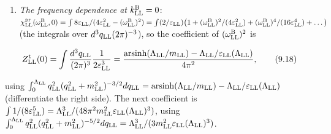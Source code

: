 \documentclass[
  10pt,
]{article}
\providecommand{\tightlist}{%
  \setlength{\itemsep}{0pt}\setlength{\parskip}{0pt}}
\begin{document}
\begin{enumerate}
\def\labelenumi{(\roman{enumi})}
\setcounter{enumi}{1}
\tightlist
\item
  \emph{The frequency dependence at \(k^{\rm B}_{\rm LL}=0\)}:
  \(\chi^{\rm pr}_{\rm LL}(\omega^{\rm B}_{\rm LL},0)=\int8\varepsilon_{\rm LL}/(4\varepsilon_{\rm LL}^2-(\omega^{\rm B}_{\rm LL})^2)=\int(2/\varepsilon_{\rm LL})\big(1+(\omega^{\rm B}_{\rm LL})^2/(4\varepsilon_{\rm LL}^2)+(\omega^{\rm B}_{\rm LL})^4/(16\varepsilon_{\rm LL}^4)+\dots\big)\)
  (the integrals over \(d^3q_{\rm LL}(2\pi)^{-3}\)), so the coefficient
  of \((\omega^{\rm B}_{\rm LL})^2\) is
\end{enumerate}

\[Z^{\rm t}_{\rm LL}(0)=\int\frac{d^3q_{\rm LL}}{(2\pi)^3}\frac1{2\varepsilon_{\rm LL}^3}=\frac{\mathrm{arsinh}(\Lambda_{\rm LL}/m_{\rm LL})-\Lambda_{\rm LL}/\varepsilon_{\rm LL}(\Lambda_{\rm LL})}{4\pi^2},\tag{9.18}\]

using
\(\int_0^{\Lambda_{\rm LL}}q_{\rm LL}^2(q_{\rm LL}^2+m_{\rm LL}^2)^{-3/2}dq_{\rm LL}=\mathrm{arsinh}(\Lambda_{\rm LL}/m_{\rm LL})-\Lambda_{\rm LL}/\varepsilon_{\rm LL}(\Lambda_{\rm LL})\)
(differentiate the right side). The next coefficient is
\(\int1/(8\varepsilon_{\rm LL}^5)=\Lambda_{\rm LL}^3/(48\pi^2m_{\rm LL}^2\varepsilon_{\rm LL}(\Lambda_{\rm LL})^3)\),
using
\(\int_0^{\Lambda_{\rm LL}}q_{\rm LL}^2(q_{\rm LL}^2+m_{\rm LL}^2)^{-5/2}dq_{\rm LL}=\Lambda_{\rm LL}^3/(3m_{\rm LL}^2\varepsilon_{\rm LL}(\Lambda_{\rm LL})^3)\).
\end{document}
